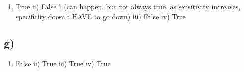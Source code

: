 \documentclass[
]{article}
\providecommand{\tightlist}{%
  \setlength{\itemsep}{0pt}\setlength{\parskip}{0pt}}
\begin{document}
\begin{enumerate}
\def\labelenumi{\roman{enumi})}
\tightlist
\item
  True ii) False ? (can happen, but not always true. as sensitivity
  increases, specificity doesn't HAVE to go down) iii) False iv) True
\end{enumerate}

\hypertarget{g}{%
\subsection{g)}\label{g}}

\begin{enumerate}
\def\labelenumi{\roman{enumi})}
\tightlist
\item
  False ii) True iii) True iv) True
\end{enumerate}
\end{document}
